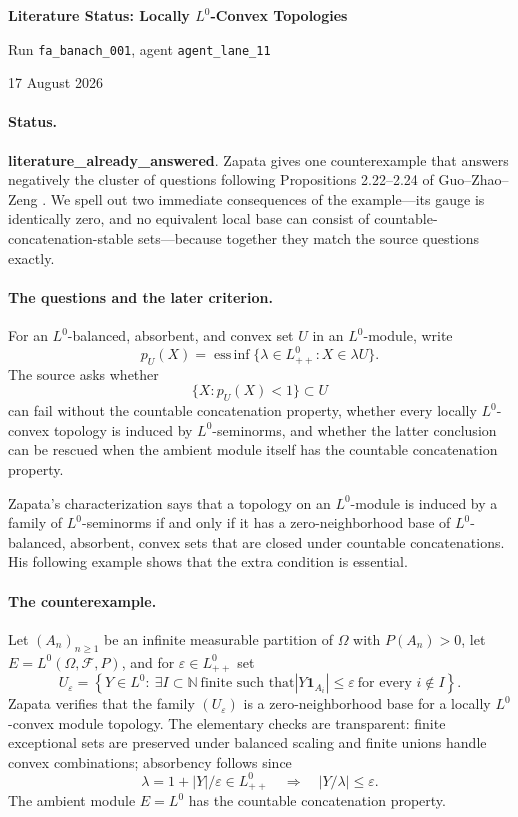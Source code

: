 \documentclass[10pt]{article}
\newcommand{\F}{\mathcal F}
\newcommand{\one}{\mathbf 1}
\begin{document}
\begin{center}
{\Large\bfseries Literature Status: Locally $L^0$-Convex Topologies\par}
\vspace{0.35em}
{Run \texttt{fa\_banach\_001}, agent \texttt{agent\_lane\_11}\par}
{\small 17 August 2026}
\end{center}
\vspace{0.35em}

\paragraph{Status.}
\textbf{literature\_already\_answered}.  Zapata \cite{Zapata} gives one
counterexample that answers negatively the cluster of questions following
Propositions 2.22--2.24 of Guo--Zhao--Zeng \cite{GZZ}.  We spell out two
immediate consequences of the example---its gauge is identically zero, and
no equivalent local base can consist of countable-concatenation-stable
sets---because together they match the source questions exactly.

\paragraph{The questions and the later criterion.}
For an $L^0$-balanced, absorbent, and convex set $U$ in an $L^0$-module,
write
\[
 p_U(X)=\mathop{\mathrm{ess\,inf}}\{\lambda\in L^0_{++}:X\in\lambda U\}.
\]
The source asks whether
\[
 \{X:p_U(X)<1\}\subset U                                      \tag{1}
\]
can fail without the countable concatenation property, whether every
locally $L^0$-convex topology is induced by $L^0$-seminorms, and whether
the latter conclusion can be rescued when the ambient module itself has
the countable concatenation property.

Zapata's characterization says that a topology on an $L^0$-module is
induced by a family of $L^0$-seminorms if and only if it has a zero-neighborhood
base of $L^0$-balanced, absorbent, convex sets that are closed under
countable concatenations.  His following example shows that the extra
condition is essential.

\paragraph{The counterexample.}
Let $(A_n)_{n\geq1}$ be an infinite measurable partition of $\Omega$ with
$P(A_n)>0$, let $E=L^0(\Omega,\F,P)$, and for
$\varepsilon\in L^0_{++}$ set
\[
 U_\varepsilon=
 \left\{Y\in L^0:\ \exists I\subset\mathbb N\ \text{finite such that}
 |Y\one_{A_i}|\leq\varepsilon\ \text{for every }i\notin I\right\}.       \tag{2}
\]
Zapata verifies that the family $(U_\varepsilon)$ is a zero-neighborhood
base for a locally $L^0$-convex module topology.  The elementary checks are
transparent: finite exceptional sets are preserved under balanced scaling
and finite unions handle convex combinations; absorbency follows since
\[
 \lambda=1+|Y|/\varepsilon\in L^0_{++}
 \quad\Longrightarrow\quad |Y/\lambda|\leq\varepsilon.
\]
The ambient module $E=L^0$ has the countable concatenation property.
\end{document}

